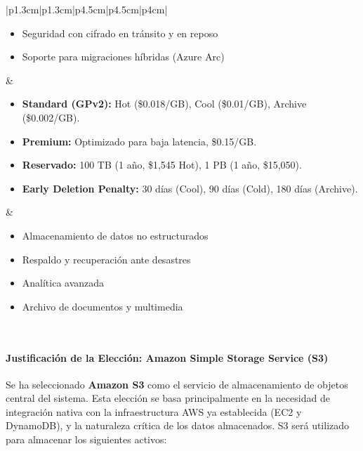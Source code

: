 \begin{table}[H]
\begin{tabular}{|p{1.3cm}|p{1.3cm}|p{4.5cm}|p{4.5cm}|p{4cm}|}
\begin{minipage}[t]{\linewidth}
\begin{itemize}
                \item Seguridad con cifrado en tránsito y en reposo
                \item Soporte para migraciones híbridas (Azure Arc)
            \end{itemize}
        \end{minipage} &
        \begin{minipage}[t]{\linewidth}
            \begin{itemize}
                \item \textbf{Standard (GPv2):} Hot (\$0.018/GB), Cool (\$0.01/GB), Archive (\$0.002/GB).
                \item \textbf{Premium:} Optimizado para baja latencia, \$0.15/GB.
                \item \textbf{Reservado:} 100 TB (1 año, \$1,545 Hot), 1 PB (1 año, \$15,050).
                \item \textbf{Early Deletion Penalty:} 30 días (Cool), 90 días (Cold), 180 días (Archive).
            \end{itemize}
        \end{minipage} &
        \begin{minipage}[t]{\linewidth}
            \begin{itemize}
                \item Almacenamiento de datos no estructurados
                \item Respaldo y recuperación ante desastres
                \item Analítica avanzada
                \item Archivo de documentos y multimedia
            \end{itemize}
        \end{minipage} \\
        \hline
    \end{tabular}
\end{table}

\paragraph{Justificación de la Elección: Amazon Simple Storage Service (S3)}
Se ha seleccionado \textbf{Amazon S3} como el servicio de almacenamiento de objetos central del sistema. Esta elección se basa principalmente en la necesidad de integración nativa con la infraestructura AWS ya establecida (EC2 y DynamoDB), y la naturaleza crítica de los datos almacenados. S3 será utilizado para almacenar los siguientes activos:


